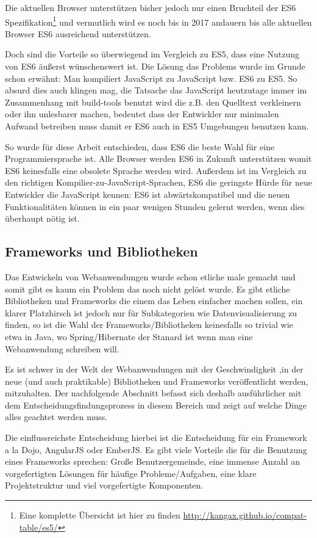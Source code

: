 \documentclass[12pt,twoside]{book}
\begin{document}
Die aktuellen Browser unterstützen bisher jedoch nur einen Bruchteil der ES6 Spezifikation\footnote{Eine komplette Übersicht ist hier zu finden \url{http://kangax.github.io/compat-table/es5/}} und vermutlich wird es noch bis in 2017 andauern bis alle aktuellen Browser ES6 ausreichend unterstützen.

Doch sind die Vorteile so überwiegend im Vergleich zu ES5, dass eine Nutzung von ES6 äußerst wünschenswert ist.
Die Lösung das Problems wurde im Grunde schon erwähnt: Man kompiliert JavaScript zu JavaScript bzw. ES6 zu ES5.
So absurd dies auch klingen mag, die Tatsache das JavaScript heutzutage immer im Zusammenhang mit build-tools benutzt wird die z.B. den Quelltext verkleinern oder ihn unlesbarer machen, bedeutet dass der Entwickler nur minimalen Aufwand betreiben muss damit er ES6 auch in ES5 Umgebungen benutzen kann.

So wurde für diese Arbeit entschieden, dass ES6 die beste Wahl für eine Programmiersprache ist. Alle Browser werden ES6 in Zukunft unterstützen womit ES6 keinesfalls eine obsolete Sprache werden wird. Außerdem ist im Vergleich zu den richtigen Kompilier-zu-JavaScript-Sprachen, ES6 die geringste Hürde für neue Entwickler die JavaScript kennen: ES6 ist abwärtskompatibel und die neuen Funktionalitäten können in ein paar wenigen Stunden gelernt werden, wenn dies überhaupt nötig ist.

\subsection{Frameworks und Bibliotheken}

Das Entwickeln von Webanwendungen wurde schon etliche male gemacht und somit gibt es kaum ein Problem das noch nicht gelöst wurde. Es gibt etliche Bibliotheken und Frameworks die einem das Leben einfacher machen sollen, ein klarer Platzhirsch ist jedoch nur für Subkategorien wie Datenvisualisierung zu finden, so ist die Wahl der Frameworks/Bibliotheken keinesfalls so trivial wie etwa in Java, wo Spring/Hibernate der Stanard ist wenn man eine Webanwendung schreiben will.

Es ist schwer in der Welt der Webanwendungen mit der Geschwindigkeit ,in der neue (und auch praktikable) Bibliotheken und Frameworks veröffentlicht werden, mitzuhalten. Der nachfolgende Abschnitt befasst sich deshalb ausführlicher mit dem Entscheidungsfindungsprozess in diesem Bereich und zeigt auf welche Dinge alles geachtet werden muss.

Die einflussreichste Entscheidung hierbei ist die Entscheidung für ein Framework a la Dojo, AngularJS oder EmberJS.
Es gibt viele Vorteile die für die Benutzung eines Frameworks sprechen: Große Benutzergemeinde, eine immense Anzahl an vorgefertigten Lösungen für häufige Probleme/Aufgaben, eine klare Projektstruktur und viel vorgefertigte Komponenten.
\end{document}
